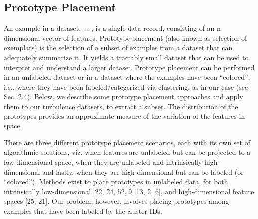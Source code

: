 \subsection{Prototype Placement}
\label{subsec:prototype_placement}

An example in a dataset, ... , is a single data record, consisting of an n-dimensional vector of features. Prototype placement (also known as selection of exemplars) is the selection of a subset of examples from a dataset that can adequately summarize it. It yields a tractably small dataset that can be used to interpret and understand a larger dataset. Prototype placement can be performed in an unlabeled dataset or in a dataset where the examples have been “colored”, i.e., where they have been labeled/categorized via clustering, as in our case (see Sec. 2.4). Below, we describe some prototype placement approaches and apply them to our turbulence datasets, to extract a subset. The distribution of the prototypes provides an approximate measure of the variation of the features in space.

There are three different prototype placement scenarios, each with its own set of algorithmic solutions, viz. when features are unlabeled but can be projected to a low-dimensional space, when they are unlabeled and
intrinsically high-dimensional and lastly, when they are high-dimensional but can be labeled (or “colored”).
Methods exist to place prototypes in unlabeled data, for both intrinsically
low-dimensional [22, 24, 52, 9, 13, 2, 6], and high-dimensional feature spaces [25, 21]. Our problem,
however, involves placing prototypes among examples that have been labeled by the cluster IDs.

